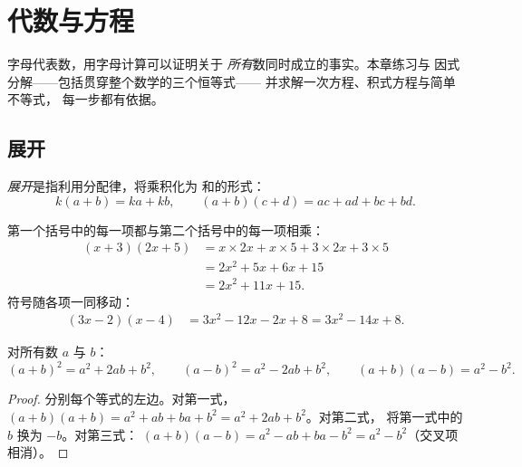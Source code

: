 \chapter{代数与方程}\label{ch:g9:algebra}

字母代表数，用字母计算可以证明关于
\emph{所有}数同时成立的事实。本章练习与
因式分解——包括贯穿整个数学的三个恒等式——
并求解一次方程、积式方程与简单不等式，
每一步都有依据。

\section{展开}

\begin{definition}[展开]\label{def:g9:algebra:expand}
\emph{展开}是指利用分配律，将乘积化为
和的形式：
\[
k(a + b) = ka + kb,
\qquad
(a + b)(c + d) = ac + ad + bc + bd .
\]
\end{definition}

\begin{example}\label{ex:g9:algebra:expand}
第一个括号中的每一项都与第二个括号中的每一项相乘：
\begin{align*}
(x + 3)(2x + 5)
&= x \times 2x + x \times 5 + 3 \times 2x + 3 \times 5 \\
&= 2x^2 + 5x + 6x + 15 \\
&= 2x^2 + 11x + 15 .
\end{align*}
符号随各项一同移动：
\begin{align*}
(3x - 2)(x - 4)
&= 3x^2 - 12x - 2x + 8
= 3x^2 - 14x + 8 .
\end{align*}
\end{example}

\begin{theorem}[三个恒等式]\label{thm:g9:algebra:identities}
对所有数 $a$ 与 $b$：
\[
(a+b)^2 = a^2 + 2ab + b^2,
\qquad
(a-b)^2 = a^2 - 2ab + b^2,
\qquad
(a+b)(a-b) = a^2 - b^2 .
\]
\end{theorem}

\begin{proof}
分别每个等式的左边。对第一式，
$(a+b)(a+b) = a^2 + ab + ba + b^2 = a^2 + 2ab + b^2$。对第二式，
将第一式中的 $b$ 换为 $-b$。对第三式：
$(a+b)(a-b) = a^2 - ab + ba - b^2 = a^2 - b^2$（交叉项相消）。
\end{proof}

